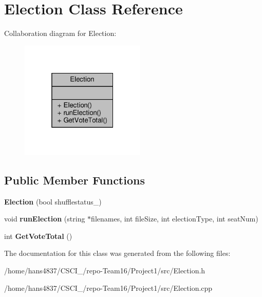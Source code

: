 \hypertarget{classElection}{}\section{Election Class Reference}
\label{classElection}


Collaboration diagram for Election\+:\nopagebreak
\begin{figure}[H]
\begin{center}
\leavevmode
\includegraphics[width=169pt]{classElection__coll__graph}
\end{center}
\end{figure}
\subsection*{Public Member Functions}
\begin{DoxyCompactItemize}
\item 
\mbox{\label{classElection_af00d655bcd6df012b8442b1b58f4d6c9}} 
{\bfseries Election} (bool shufflestatus\+\_\+)
\item 
\mbox{\label{classElection_a7d5ab53dbe8b72de6c7442715601c842}} 
void {\bfseries run\+Election} (string $\ast$filenames, int file\+Size, int election\+Type, int seat\+Num)
\item 
\mbox{\label{classElection_a1c41b29c48ed8e6c612fe2ba44222b5b}} 
int {\bfseries Get\+Vote\+Total} ()
\end{DoxyCompactItemize}


The documentation for this class was generated from the following files\+:\begin{DoxyCompactItemize}
\item 
/home/hans4837/\+C\+S\+C\+I\+\_/repo-\/\+Team16/\+Project1/src/Election.\+h\item 
/home/hans4837/\+C\+S\+C\+I\+\_/repo-\/\+Team16/\+Project1/src/Election.\+cpp\end{DoxyCompactItemize}
